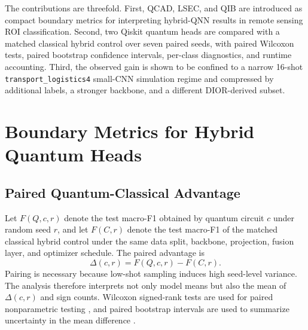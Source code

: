 \documentclass[journal]{IEEEtran}
\newcommand{\TL}{\texttt{transport\_logistics4}}
\begin{document}
The contributions are threefold. First, QCAD, LSEC, and QIB are introduced as compact boundary metrics for interpreting hybrid-QNN results in remote sensing ROI classification. Second, two Qiskit quantum heads are compared with a matched classical hybrid control over seven paired seeds, with paired Wilcoxon tests, paired bootstrap confidence intervals, per-class diagnostics, and runtime accounting. Third, the observed gain is shown to be confined to a narrow 16-shot \TL{} small-CNN simulation regime and compressed by additional labels, a stronger backbone, and a different DIOR-derived subset.

\section{Boundary Metrics for Hybrid Quantum Heads}
\subsection{Paired Quantum-Classical Advantage}
Let $F(Q,c,r)$ denote the test macro-F1 obtained by quantum circuit $c$ under random seed $r$, and let $F(C,r)$ denote the test macro-F1 of the matched classical hybrid control under the same data split, backbone, projection, fusion layer, and optimizer schedule. The paired advantage is
\begin{equation}
\Delta(c,r)=F(Q,c,r)-F(C,r).
\end{equation}
Pairing is necessary because low-shot sampling induces high seed-level variance. The analysis therefore interprets not only model means but also the mean of $\Delta(c,r)$ and sign counts. Wilcoxon signed-rank tests are used for paired nonparametric testing \cite{wilcoxon1945individual}, and paired bootstrap intervals are used to summarize uncertainty in the mean difference \cite{efron1979bootstrap}.
\end{document}
